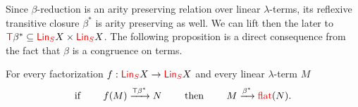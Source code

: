 Since $\beta$-reduction is an arity preserving relation  over linear $\lambda$-terms, its reflexive transitive closure $\beta^*$ is arity preserving as well.  We can lift then the later to ${\color{red}{\mathsf T}} \beta^*\subseteq {\color{red}{\mathsf{Lin}_{S}}} X\times{\color{red}{\mathsf{Lin}_{S}}} X$.
The following proposition is a direct consequence from the fact that $\beta$ is a congruence on terms.

\begin{proposition}\label{prop:betaCommutesWithFacto}
For every factorization $f:{\color{red}{\mathsf{Lin}_{S}}} X \to {\color{red}{\mathsf{Lin}_{S}}} X$ and every linear $\lambda$-term $M$
$$\text{if }\qquad f(M) \xrightarrow{{\color{red}{\mathsf T}} \beta^*} N \qquad\text{ then }\qquad M\xrightarrow{\beta^*} {\color{red}{\mathrm{flat}}}(N).$$
\end{proposition}



